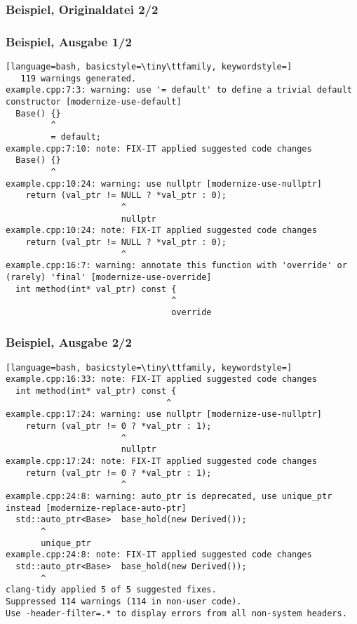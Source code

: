 \documentclass[aspectratio=169]{beamer}
\begin{document}
\begin{frame}[fragile]
  \frametitle{Beispiel, Originaldatei 2/2}
  
\end{frame}

\begin{frame}[fragile]
  \frametitle{Beispiel, Ausgabe 1/2}
  \begin{lstlisting}[language=bash, basicstyle=\tiny\ttfamily, keywordstyle=]
   119 warnings generated.
example.cpp:7:3: warning: use '= default' to define a trivial default constructor [modernize-use-default]
  Base() {}
         ^
         = default;
example.cpp:7:10: note: FIX-IT applied suggested code changes
  Base() {}
         ^
example.cpp:10:24: warning: use nullptr [modernize-use-nullptr]
    return (val_ptr != NULL ? *val_ptr : 0);
                       ^
                       nullptr
example.cpp:10:24: note: FIX-IT applied suggested code changes
    return (val_ptr != NULL ? *val_ptr : 0);
                       ^
example.cpp:16:7: warning: annotate this function with 'override' or (rarely) 'final' [modernize-use-override]
  int method(int* val_ptr) const {
                                 ^
                                 override
\end{lstlisting}
\end{frame}
\begin{frame}[fragile]
  \frametitle{Beispiel, Ausgabe 2/2}
\begin{lstlisting}[language=bash, basicstyle=\tiny\ttfamily, keywordstyle=]
example.cpp:16:33: note: FIX-IT applied suggested code changes
  int method(int* val_ptr) const {
                                ^
example.cpp:17:24: warning: use nullptr [modernize-use-nullptr]
    return (val_ptr != 0 ? *val_ptr : 1);
                       ^
                       nullptr
example.cpp:17:24: note: FIX-IT applied suggested code changes
    return (val_ptr != 0 ? *val_ptr : 1);
                       ^
example.cpp:24:8: warning: auto_ptr is deprecated, use unique_ptr instead [modernize-replace-auto-ptr]
  std::auto_ptr<Base>  base_hold(new Derived());
       ^
       unique_ptr
example.cpp:24:8: note: FIX-IT applied suggested code changes
  std::auto_ptr<Base>  base_hold(new Derived());
       ^
clang-tidy applied 5 of 5 suggested fixes.
Suppressed 114 warnings (114 in non-user code).
Use -header-filter=.* to display errors from all non-system headers. 
\end{lstlisting}
\end{frame}
\end{document}
